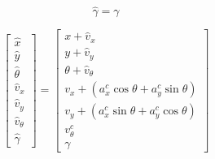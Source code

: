 \documentclass[oneside, 12pt, a4paper]{book}
\begin{document}

\begin{equation}
    \hat{\gamma} = \gamma
\end{equation}

\begin{equation}
    \begin{bmatrix}
        \hat{x} \\ \hat{y} \\ \hat{\theta} \\
        \hat{v}_x \\ \hat{v}_y \\ \hat{v}_\theta \\
        \hat{\gamma}
    \end{bmatrix}
    =     
    \begin{bmatrix}
        x + \hat{v}_x \\ y + \hat{v}_y \\ \theta + \hat{v}_\theta \\
        v_x + (a^c_x\cos\theta + a^c_y\sin\theta) \\ v_y + (a^c_x\sin\theta + a^c_y\cos\theta)\\ v^c_\theta \\
        \gamma
    \end{bmatrix}
\end{equation}
\end{document}
